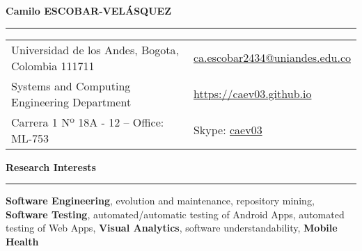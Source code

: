 \documentclass[letterpaper,11pt,oneside]{article}
\newcommand*{\Skype}{\href{skype:caev03?add}{caev03}}
\newcommand{\Absender}[1][\normalsize]{\Skype}
\begin{document}

\noindent \Huge{\textbf{Camilo ESCOBAR-VEL\'{A}SQUEZ}} \\
\vspace{-2ex}
\hrule 
\normalsize


\begin{center}
\begin{tabular}{ll}
 Universidad de los Andes, Bogota, Colombia 111711   & \hspace{0.5in} \href{mailto:ca.escobar2434@uniandes.edu.co}{ca.escobar2434@uniandes.edu.co} \\
 Systems and Computing Engineering Department    & \hspace{0.5in}  \href{https://caev03.github.io}{https://caev03.github.io}   \\
 Carrera 1 Nº 18A - 12 --	Office: ML-753           & \hspace{0.5in} Skype: \Absender  \\
\end{tabular}
\end{center}

\vspace{2em}

\noindent \Large{\textbf{Research Interests}} \\
\vspace{-2ex}
\hrule 
\normalsize
\vspace{2ex}
\noindent \textbf{Software Engineering}, evolution and maintenance, repository mining, \textbf{Software Testing}, automated/automatic testing of Android Apps, automated testing of Web Apps, \textbf{Visual Analytics}, software understandability, \textbf{Mobile Health} \\
\\
\end{document}

